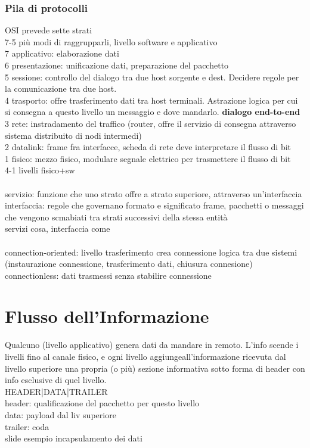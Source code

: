 \documentclass[10pt]{article}
\begin{document}
\subsubsection{Pila di protocolli}
OSI prevede sette strati\\
7-5 più modi di raggrupparli, livello software e applicativo\\
7 applicativo: elaborazione dati\\
6 presentazione: unificazione dati, preparazione del pacchetto\\
5 sessione: controllo del dialogo tra due host sorgente e dest. Decidere regole per la comunicazione tra due host.\\
4 trasporto: offre trasferimento dati tra host terminali. Astrazione logica per cui si consegna a questo livello un messaggio e dove mandarlo. \textbf{dialogo end-to-end}\\
3 rete: instradamento del traffico (router, offre il servizio di consegna attraverso sistema distribuito di nodi intermedi)\\
2 datalink: frame fra interfacce, scheda di rete deve interpretare il flusso di bit\\
1 fisico: mezzo fisico, modulare segnale elettrico per trasmettere il flusso di bit\\
4-1 livelli fisico+sw\\\\
servizio: funzione che uno strato offre a strato superiore, attraverso un'interfaccia\\
interfaccia: regole che governano formato e significato frame, pacchetti o messaggi che vengono scmabiati tra strati successivi della stessa entità\\
servizi cosa, interfaccia come\\\\
connection-oriented: livello trasferimento crea connessione logica tra due sistemi (instaurazione connessione, trasferimento dati, chiusura connesione)\\
connectionless: dati trasmessi senza stabilire connessione\\

\section{Flusso dell'Informazione}
Qualcuno (livello applicativo) genera dati da mandare in remoto. L'info scende i livelli fino al canale fisico, e ogni livello aggiungeall'informazione ricevuta dal livello superiore una propria (o più) sezione informativa sotto forma di header con info esclusive di quel livello.\\
HEADER|DATA|TRAILER\\
header: qualificazione del pacchetto per questo livello\\
data: payload dal liv superiore\\
trailer: coda\\
slide esempio incapsulamento dei dati\\
\end{document}
